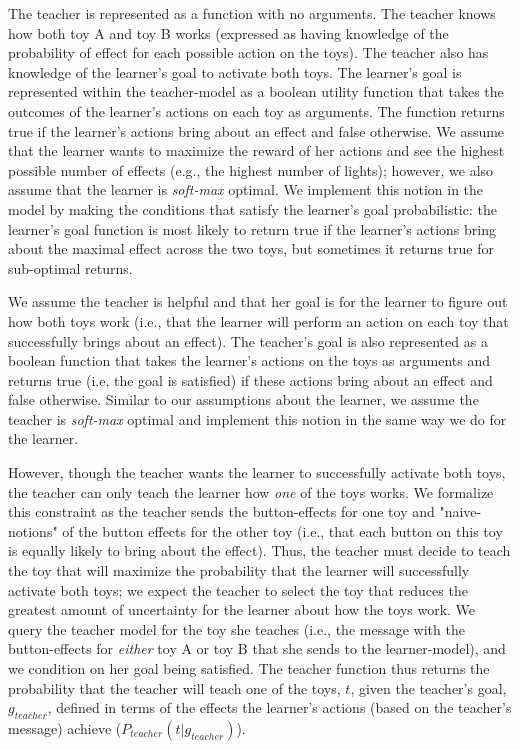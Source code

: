 \documentclass[10pt,letterpaper]{article}
\begin{document}
The teacher is represented as a function with no arguments. The teacher knows how both toy A and toy B works (expressed as having knowledge of the probability of effect for each possible action on the toys). The teacher also has knowledge of the learner's goal to activate both toys. The learner's goal is represented within the teacher-model as a boolean utility function that takes the outcomes of the learner's actions on each toy as arguments. The function returns true if the learner's actions bring about an effect and false otherwise. We assume that the learner wants to maximize the reward of her actions and see the highest possible number of effects (e.g., the highest number of lights); however, we also assume that the learner is \textit{soft-max} optimal. We implement this notion in the model by making the conditions that satisfy the learner's goal probabilistic: the learner's goal function is most likely to return true if the learner's actions bring about the maximal effect across the two toys, but sometimes it returns true for sub-optimal returns. 

We assume the teacher is helpful and that her goal is for the learner to figure out how both toys work (i.e., that the learner will perform an action on each toy that successfully brings about an effect). The teacher's goal is also represented as a boolean function that takes the learner's actions on the toys as arguments and returns true (i.e, the goal is satisfied) if these actions bring about an effect and false otherwise. Similar to our assumptions about the learner, we assume the teacher is \textit{soft-max} optimal and implement this notion in the same way we do for the learner. 

However, though the teacher wants the learner to successfully activate both toys, the teacher can only teach the learner how \textit{one} of the toys works. We formalize this constraint as the teacher sends the button-effects for one toy and "naive-notions" of the button effects for the other toy (i.e., that each button on this toy is equally likely to bring about the effect). Thus, the teacher must decide to teach the toy that will maximize the probability that the learner will successfully activate both toys; we expect the teacher to select the toy that reduces the greatest amount of uncertainty for the learner about how the toys work. We query the teacher model for the toy she teaches (i.e., the message with the button-effects for \textit{either} toy A or toy B that she sends to the learner-model), and we condition on her goal being satisfied. The teacher function thus returns the probability that the teacher will teach one of the toys, $t$, given the teacher's goal, $g_{teacher}$, defined in terms of the effects the learner's actions (based on the teacher's message) achieve ($P_{teacher}(t | g_{teacher})$).
\end{document}
